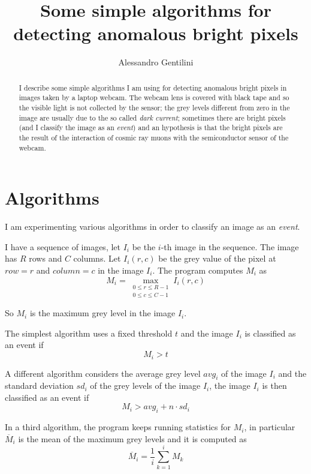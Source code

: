 \documentclass[a4paper,12pt]{article}
\title{Some simple algorithms for detecting anomalous bright pixels}
\author{Alessandro Gentilini}
\begin{document}
\maketitle

\begin{abstract}
I describe some simple algorithms I am using for detecting anomalous bright pixels in images taken by a laptop webcam.
The webcam lens is covered with black tape and so the visible light is not collected by the sensor; the grey levels different from zero in the image are usually due to the so called \emph{dark current}; sometimes there are bright pixels (and I classify the image as an \emph{event}) and an hypothesis is that the bright pixels are the result of the interaction of cosmic ray muons with the semiconductor sensor of the webcam.
\end{abstract} 

\section{Algorithms}
I am experimenting various algorithms in order to classify an image as an \emph{event}.

I have a sequence of images, let $I_i$ be the $i$-th image in the sequence. The image has $R$ rows and $C$ columns. Let $I_i(r,c)$ be the grey value of the pixel at $row=r$ and $column=c$ in the image $I_i$.
The program computes $M_i$ as 
$$M_i=\max_{\substack{
   0\leq r\leq R-1 \\
   0\leq c\leq C-1
  }}
 I_i(r,c)$$

So $M_i$ is the maximum grey level in the image $I_i$.

The simplest algorithm uses a fixed threshold $t$ and the image $I_i$ is classified as an event if 
\begin{equation}
M_i>t
\end{equation}

A different algorithm considers the average grey level $avg_i$ of the image $I_i$ and the standard deviation $sd_i$ of the grey levels of the image $I_i$, the image $I_i$ is then classified as an event if 
\begin{equation}
M_i>avg_i+n\cdot sd_i
\end{equation}

 In a third algorithm, the program keeps running statistics for $M_i$, in particular $\overline{M}_i$ is the mean of the maximum grey levels and it is computed as
 $$\overline{M}_i=\frac{1}{i}\sum_{k=1}^i M_k$$
\end{document}
